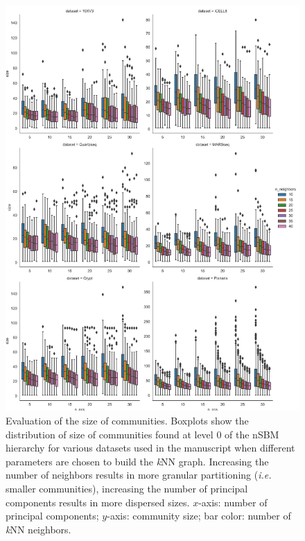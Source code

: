 \documentclass[11pt, titlepage, twoside]{article}
\begin{document}
\clearpage
\begin{figure}[H]
\centering
\includegraphics[keepaspectratio,width=.95\textwidth,height=\textheight]{Community_Size_L0.pdf}
\caption[]{Evaluation of the size of communities. Boxplots show the distribution of size of communities found at level 0 of the nSBM hierarchy for various datasets used in the manuscript when different parameters are chosen to build the \emph{k}NN graph. Increasing the number of neighbors results in more granular partitioning (\emph{i.e.} smaller communities), increasing the number of principal components results in more dispersed sizes. $x$-axis: number of principal components; $y$-axis: community size; bar color: number of \emph{k}NN neighbors.} \label{Figure_Comm_Size}
\end{figure}
\end{document}
